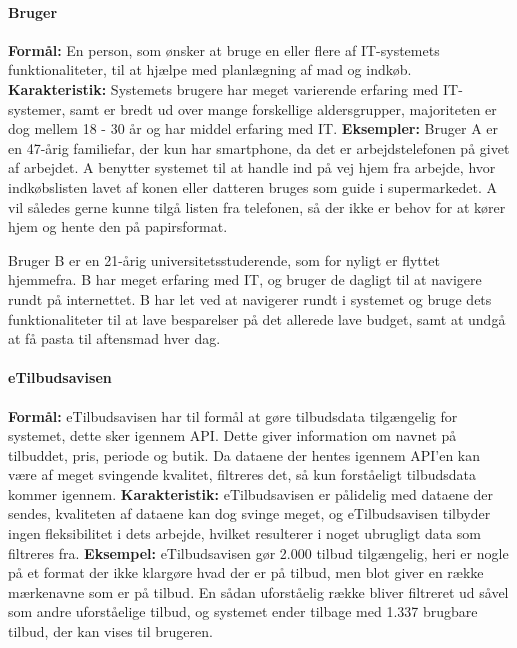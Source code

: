\paragraph*{Bruger}
\textbf{Formål:} En person, som ønsker at bruge en eller flere af IT-systemets funktionaliteter, til at hjælpe med planlægning af mad og indkøb.
\textbf{Karakteristik:} Systemets brugere har meget varierende erfaring med IT-systemer, samt er bredt ud over mange forskellige aldersgrupper, majoriteten er dog  mellem 18 - 30 år og har middel erfaring med IT.
\textbf{Eksempler:} Bruger A er en 47-årig familiefar, der kun har smartphone, da det er arbejdstelefonen på givet af arbejdet. 
A benytter systemet til at handle ind på vej hjem fra arbejde, hvor indkøbslisten lavet af konen eller datteren bruges som guide i supermarkedet. 
A vil således gerne kunne tilgå listen fra telefonen, så der ikke er behov for at kører hjem og hente den på papirsformat.

Bruger B er en 21-årig universitetsstuderende, som for nyligt er flyttet hjemmefra. B har meget erfaring med IT, og bruger de dagligt til at navigere rundt på internettet. 
B har let ved at navigerer rundt i systemet og bruge dets funktionaliteter til at lave besparelser på det allerede lave budget, samt at undgå at få pasta til aftensmad hver dag.

\paragraph*{eTilbudsavisen}
\textbf{Formål:} eTilbudsavisen har til formål at gøre tilbudsdata tilgængelig for systemet, dette sker igennem API.
Dette giver information om navnet på tilbuddet, pris, periode og butik. 
Da dataene der hentes igennem API'en kan være af meget svingende kvalitet, filtreres det, så kun forståeligt tilbudsdata kommer igennem.
\textbf{Karakteristik:} eTilbudsavisen er pålidelig med dataene der sendes, kvaliteten af dataene kan dog svinge meget, og eTilbudsavisen tilbyder ingen fleksibilitet i dets arbejde, hvilket resulterer i noget ubrugligt data som filtreres fra.
\textbf{Eksempel:} eTilbudsavisen gør 2.000 tilbud tilgængelig, heri er nogle på et format der ikke klargøre hvad der er på tilbud, men blot giver en række mærkenavne som er på tilbud.
En sådan uforståelig række bliver filtreret ud såvel som andre uforståelige tilbud, og systemet ender tilbage med 1.337 brugbare tilbud, der kan vises til brugeren.

